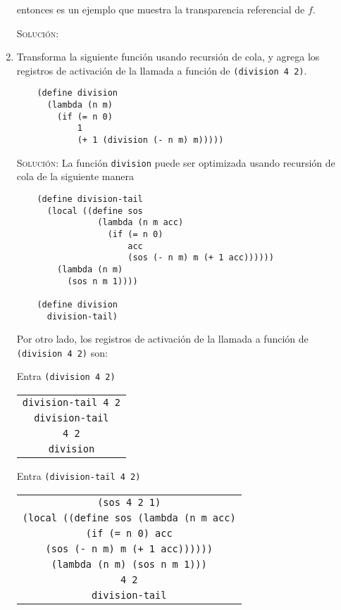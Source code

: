 \documentclass[letterpaper,11pt]{article}
\begin{document}
\begin{enumerate}
    entonces es un ejemplo que muestra la transparencia referencial de $f$.

    \textsc{Solución:}

    \item Transforma la siguiente función usando recursión de cola, y agrega
    los registros de activación de la llamada a función de 
    \texttt{(division 4 2)}.
    \begin{verbatim}
    (define division
      (lambda (n m)
        (if (= n 0)
            1
            (+ 1 (division (- n m) m)))))
    \end{verbatim}

    \textsc{Solución:} La función \texttt{division} puede ser optimizada 
    usando recursión de cola de la siguiente manera 
    \begin{verbatim}
    (define division-tail
      (local ((define sos 
                (lambda (n m acc)
                  (if (= n 0)
                      acc
                      (sos (- n m) m (+ 1 acc))))))
        (lambda (n m)
          (sos n m 1))))

    (define division 
      division-tail)
    \end{verbatim}

    Por otro lado, los registros de activación de la llamada a función de 
    \texttt{(division 4 2)} son:

    Entra \texttt{(division 4 2)}
    \begin{center}
        \begin{tabular}{|c|}
            \hline
            \texttt{division-tail 4 2} \\
            \texttt{division-tail} \\
            \texttt{4 2} \\
            \texttt{division} \\
            \hline
        \end{tabular}
    \end{center}

    Entra \texttt{(division-tail 4 2)}
    \begin{center}
        \begin{tabular}[h]{|c|}
            \hline
            \texttt{(sos 4 2 1)} \\
            \texttt{(local ((define sos 
                              (lambda (n m acc)} \\
            \texttt{(if (= n 0)
                        acc} \\
            \texttt{(sos (- n m) m (+ 1 acc))))))} \\  
            \texttt{(lambda (n m)
                      (sos n m 1)))} \\
            \texttt{4 2} \\ 
            \texttt{division-tail} \\
            \hline
        \end{tabular}
    \end{center}


\end{enumerate}
\end{document}
